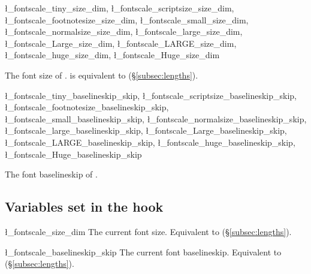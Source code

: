 \documentclass{beerydoc}
\begin{document}
\begin{codedoc}
  {
    \l_fontscale_tiny_size_dim,
    \l_fontscale_scriptsize_size_dim,
    \l_fontscale_footnotesize_size_dim,
    \l_fontscale_small_size_dim,
    \l_fontscale_normalsize_size_dim,
    \l_fontscale_large_size_dim,
    \l_fontscale_Large_size_dim,
    \l_fontscale_LARGE_size_dim,
    \l_fontscale_huge_size_dim,
    \l_fontscale_Huge_size_dim
  }
  \begin{syntax}
  \end{syntax}
  The font size of .
   is equivalent to 
  (\S\ref{subsec:lengths}).
\end{codedoc}

\begin{codedoc}
  {
    \l_fontscale_tiny_baselineskip_skip,
    \l_fontscale_scriptsize_baselineskip_skip,
    \l_fontscale_footnotesize_baselineskip_skip,
    \l_fontscale_small_baselineskip_skip,
    \l_fontscale_normalsize_baselineskip_skip,
    \l_fontscale_large_baselineskip_skip,
    \l_fontscale_Large_baselineskip_skip,
    \l_fontscale_LARGE_baselineskip_skip,
    \l_fontscale_huge_baselineskip_skip,
    \l_fontscale_Huge_baselineskip_skip
  }
  \begin{syntax}
  \end{syntax}
  The font baselineskip of .
\end{codedoc}

\subsection{Variables set in the  hook}
\label{subsec:varselectfont}

\begin{codedoc}{\l_fontscale_size_dim}
  The current font size.
  Equivalent to  (\S\ref{subsec:lengths}).
\end{codedoc}

\begin{codedoc}{\l_fontscale_baselineskip_skip}
  The current font baselineskip.
  Equivalent to  (\S\ref{subsec:lengths}).
\end{codedoc}
\end{document}
